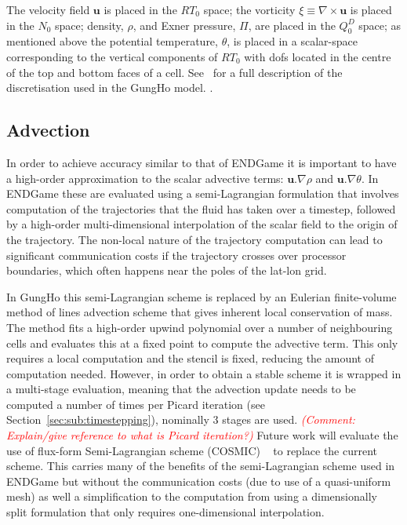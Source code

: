 \documentclass[times]{elsarticle}
\begin{document}
%
The velocity field $\mathbf{u}$ is placed in the $RT_0$ space; the vorticity 
$\xi\equiv\nabla\times\mathbf{u}$ is placed in the $N_0$ space; density, $\rho$, 
and Exner pressure, $\Pi$, are placed in the $Q_0^D$ space; as mentioned above 
the potential temperature, $\theta$, is placed in a scalar-space corresponding 
to the vertical components of $RT_0$ with dofs located in the
centre of the top and bottom faces of a cell. See~\cite{melvin2018} for a full
description of the discretisation used in the GungHo model.
.

\subsection{Advection\label{sec:sub:advection}}
In order to achieve accuracy similar to that of ENDGame it is important to have 
a high-order approximation to the scalar advective terms: $\mathbf{u}.\nabla\rho$ 
and $\mathbf{u}.\nabla\theta$. In ENDGame these are evaluated using a 
semi-Lagrangian formulation that involves computation of the trajectories that 
the fluid has taken over a timestep, followed by a high-order multi-dimensional 
interpolation of the scalar field to the origin of the trajectory. 
The non-local nature of the trajectory computation can 
lead to significant communication costs if the trajectory crosses over processor 
boundaries, which often happens near the poles of the lat-lon grid.

In GungHo this semi-Lagrangian scheme is replaced by an Eulerian finite-volume 
method of lines advection scheme that gives inherent local conservation of mass.
The method fits a high-order upwind polynomial over a number of
neighbouring cells and evaluates this at a fixed point to compute the advective 
term. This only requires a local computation and the stencil is fixed, reducing the 
amount of computation needed. However, in order to obtain a stable scheme it is 
wrapped in a multi-stage evaluation, meaning that the advection update needs to be 
computed a number of times per Picard iteration (see Section~\ref{sec:sub:timestepping}), 
nominally 3 stages are used. \textcolor{red}{\em (Comment: Explain/give reference to what is Picard iteration?)}
Future work will evaluate the use of flux-form Semi-Lagrangian scheme (COSMIC) ~\cite{Leonard1996} 
to replace the current scheme. This carries many of the 
benefits of the semi-Lagrangian scheme used in ENDGame but without the 
communication costs (due to use of a quasi-uniform mesh) as well a simplification 
to the computation from using a dimensionally split formulation that only requires 
one-dimensional interpolation.
\end{document}
